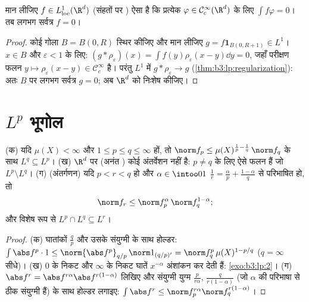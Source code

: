 \begin{corollary}\label{cor:b3:lp:fundlemma}
मान लीजिए $f \in L^1_{\mathrm{loc}}(\R^d)$ (संहतों पर ) ऐसा है कि प्रत्येक $\varphi \in \mathcal
C^\infty_c(\R^d)$ के
लिए $\int f\varphi = 0$। तब लगभग सर्वत्र $f = 0$।
\end{corollary}

\begin{proof}
कोई गोला $B = B(0, R)$ स्थिर कीजिए और मान लीजिए $g = f\mathbf 1_{B(0, R+1)}
\in L^1$। $x \in B$ और $\varepsilon < 1$ के
लिए: $(g *
\rho_\varepsilon)(x) = \int f(y)\rho_\varepsilon(x - y)\dd y =
0$, जहाँ परीक्षण फलन $y \mapsto \rho_\varepsilon(x-y)
\in \mathcal C_c^\infty$ है। परंतु $L^1$ में $g * \rho_\varepsilon \to g$
(\cref{thm:b3:lp:regularization}): अतः $B$ पर लगभग सर्वत्र $g = 0$; अब $\R^d$ को निःशेष
कीजिए।
\end{proof}

\section{\texorpdfstring{$L^p$}{Lp} भूगोल}

\begin{proposition}\label{prop:b3:lp:inclusions}
(क) यदि $\mu(X) < \infty$ और $1 \leq p \leq q \leq \infty$ हों, तो $\norm f_p \leq
\mu(X)^{\frac1p - \frac1q}\,\norm f_q$ के साथ $L^q \subseteq L^p$।
(ख) $\R^d$ पर (अनंत ) कोई अंतर्वेशन नहीं है: $p \neq q$ के लिए ऐसे
फलन हैं जो $L^p\setminus L^q$।
(ग) (अंतर्गणन) यदि $p < r < q$ हो और $\alpha \in \intoo01$ $\frac1r = \frac\alpha p + \frac{1 - \alpha}q$ से परिभाषित हो, तो
\[
\norm f_r \leq \norm f_p^{\alpha}\,\norm f_q^{1 - \alpha} ;
\]
और विशेष रूप से $L^p \cap L^q \subseteq L^r$।
\end{proposition}

\begin{proof}
(क) घातांकों $\frac qp$ और उसके संयुग्मी के साथ होल्डर: $\int\abs f^p\cdot 1 \leq \norm{\abs f^p}_{q/p}\,\norm
1_{(q/p)'} = \norm f_q^p\,\mu(X)^{1 - p/q}$ ($q = \infty$
सीधे)। (ख) $0$ के निकट और $\infty$ के निकट घातें $x^{-\alpha}$ अंशांकन कर
देती हैं: \cref{exo:b3:lp:2}। (ग) $\abs f^r = \abs
f^{r\alpha}\abs f^{r(1-\alpha)}$ लिखिए और संयुग्मी युग्म $\frac p{r\alpha}$, $\frac q{r(1-\alpha)}$
(जो $\alpha$ की परिभाषा से ठीक संयुग्मी हैं) के साथ होल्डर लगाइए:
$\int\abs f^r \leq \norm f_p^{r\alpha}\norm f_q^{r(1 -
\alpha)}$।
\end{proof}


